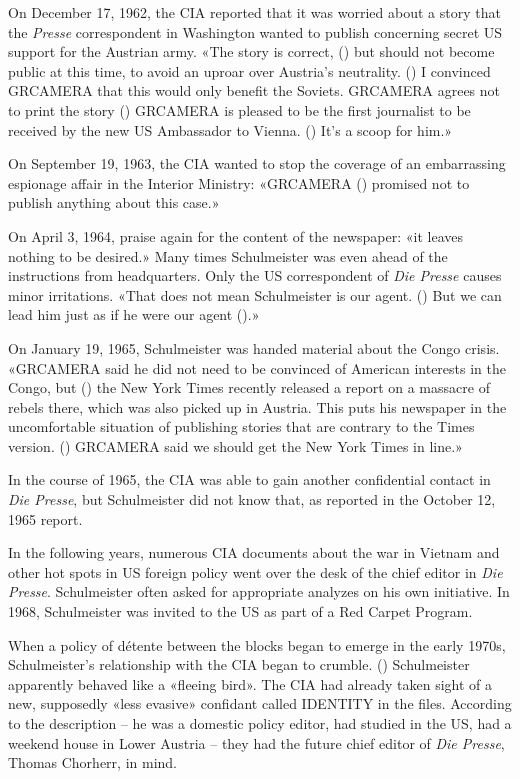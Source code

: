 On December 17, 1962, the CIA reported that it was worried about a story
that the \emph{Presse} correspondent in Washington wanted to publish
concerning secret US support for the Austrian army. «The story is
correct, () but should not become public at this time, to avoid an
uproar over Austria's neutrality. () I convinced GRCAMERA that this
would only benefit the Soviets. GRCAMERA agrees not to print the story
() GRCAMERA is pleased to be the first journalist to be received by the
new US Ambassador to Vienna. () It's a scoop for him.»

On September 19, 1963, the CIA wanted to stop the coverage of an
embarrassing espionage affair in the Interior Ministry: «GRCAMERA ()
promised not to publish anything about this case.»

On April 3, 1964, praise again for the content of the newspaper: «it
leaves nothing to be desired.» Many times Schulmeister was even ahead of
the instructions from headquarters. Only the US correspondent of
\emph{Die Presse} causes minor irritations. «That does not mean
Schulmeister is our agent. () But we can lead him just as if he were our
agent ().»

On January 19, 1965, Schulmeister was handed material about the Congo
crisis. «GRCAMERA said he did not need to be convinced of American
interests in the Congo, but () the New York Times recently released a
report on a massacre of rebels there, which was also picked up in
Austria. This puts his newspaper in the uncomfortable situation of
publishing stories that are contrary to the Times version. () GRCAMERA
said we should get the New York Times in line.»

In the course of 1965, the CIA was able to gain another confidential
contact in \emph{Die Presse}, but Schulmeister did not know that, as
reported in the October 12, 1965 report.

In the following years, numerous CIA documents about the war in Vietnam
and other hot spots in US foreign policy went over the desk of the chief
editor in \emph{Die Presse}. Schulmeister often asked for appropriate
analyzes on his own initiative. In 1968, Schulmeister was invited to the
US as part of a Red Carpet Program.

When a policy of détente between the blocks began to emerge in the early
1970s, Schulmeister's relationship with the CIA began to crumble. ()
Schulmeister apparently behaved like a «fleeing bird». The CIA had
already taken sight of a new, supposedly «less evasive» confidant called
IDENTITY in the files. According to the description -- he was a domestic
policy editor, had studied in the US, had a weekend house in Lower
Austria -- they had the future chief editor of \emph{Die Presse}, Thomas
Chorherr, in mind.

